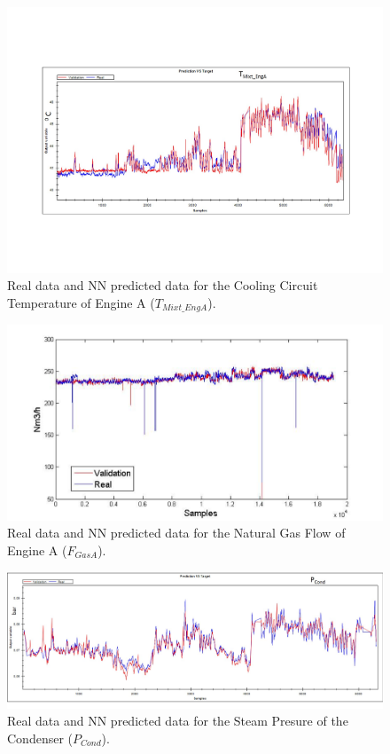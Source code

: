 \begin{figure}
\centering
\includegraphics[width=1\textwidth]{IrrigationA-ANN.pdf}
\caption{Real data and NN predicted data for the Cooling Circuit Temperature of Engine A ($T_{Mixt\_EngA}$).}
\label{TcoolA}
\end{figure}

\begin{figure}
\centering
\includegraphics[width=1\textwidth]{ANNengineD.pdf}
\caption{Real data and NN predicted data for the Natural Gas Flow  of Engine A ($F_{GasA}$).}
\label{FengineA}
\end{figure}

\begin{figure}
\centering
\includegraphics[width=1\textwidth]{ANN-STcond.pdf}
\caption{Real data and NN predicted data for the Steam Presure of the Condenser  ($P_{Cond}$).}
\label{Pcond}
\end{figure}

